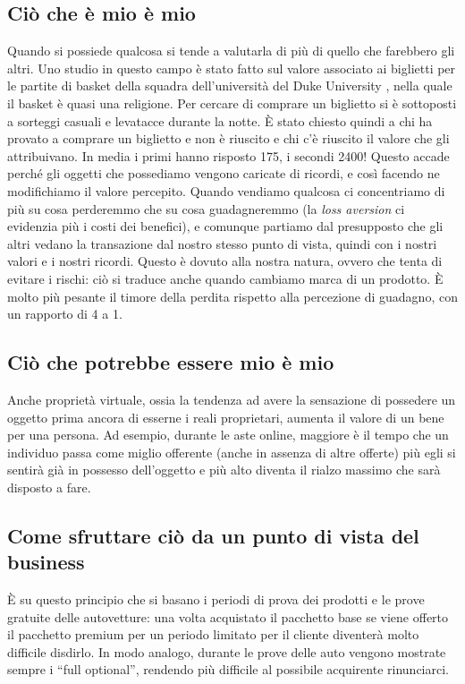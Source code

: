 \subsection{Ciò che è mio è mio}
Quando si possiede qualcosa si tende a valutarla di più di quello che farebbero
gli altri.
Uno studio in questo campo è stato fatto sul valore associato ai biglietti per
le partite di basket della squadra dell'università del Duke University
,
nella quale il basket è quasi una religione. Per
cercare di comprare un biglietto si è sottoposti a sorteggi casuali e levatacce
durante la notte. È stato chiesto quindi a chi ha provato a comprare un
biglietto e non è riuscito e chi c'è riuscito il valore che gli attribuivano.
In media i primi hanno risposto 175\textdollar{}, i secondi 2400\textdollar{}!
Questo accade perché gli oggetti che possediamo vengono caricate di ricordi, e
così facendo ne modifichiamo il valore percepito. Quando vendiamo qualcosa ci
concentriamo di più su cosa perderemmo che su cosa guadagneremmo (la
\textit{loss aversion} ci evidenzia più i costi dei benefici), e comunque
partiamo dal presupposto che gli altri vedano la transazione dal nostro stesso
punto di vista, quindi con i nostri valori e i nostri ricordi.
Questo è dovuto alla nostra natura, ovvero che tenta di evitare i rischi: ciò
si traduce anche quando cambiamo marca di un prodotto.
È molto più pesante il timore della perdita rispetto alla percezione di
guadagno, con un rapporto di 4 a 1.

\subsection{Ciò che potrebbe essere mio è mio}
Anche proprietà virtuale, ossia la tendenza ad avere la sensazione di possedere
un oggetto prima ancora di esserne i reali proprietari, aumenta il valore di un
bene per una persona. Ad esempio, durante le aste online, maggiore è il tempo
che un individuo passa come miglio offerente (anche in assenza di altre
offerte) più egli si sentirà già in possesso dell'oggetto e più alto diventa il
rialzo massimo che sarà disposto a fare.

\subsection{Come sfruttare ciò da un punto di vista del business}
È su questo principio che si basano i periodi di prova dei prodotti e le prove
gratuite delle autovetture: una volta acquistato il pacchetto base se viene
offerto il pacchetto premium per un periodo limitato per il cliente diventerà
molto difficile disdirlo. In modo analogo, durante le prove delle auto vengono
mostrate sempre i ``full optional'', rendendo più difficile al possibile
acquirente rinunciarci.
